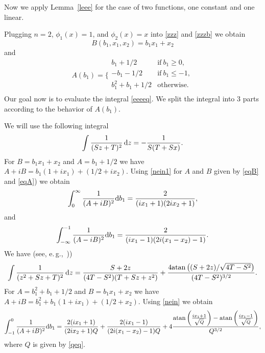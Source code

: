 \documentclass[11pt]{article}
\def\({\left(} \def\){\right)} \def\hatU{\widehat{U}}
\newenvironment{prf}[1]{\noindent{\bf{Proof #1\\}}}{$\hfill\blacksquare$\nopagebreak[4]\vskip 0.3cm}
\newcommand\BPRF[1][:]{\begin{prf}{#1}}
\begin{document}
Now we apply Lemma~\ref{leee} for the case of two functions,
one constant and one linear.
\vskip 0.3cm

\BPRF[of Theorem~\ref{looo}:] Plugging $n=2$, $\phi_1(x)=1$, and
$\phi_2(x)=x$ into \eqref{zzz} and \eqref{zzzb} we obtain
\begin{equation}\label{eqB}
B(b_1,x_1,x_2)=b_1x_1+x_2
\end{equation}
and
\begin{equation}\label{eqA}
A(b_1)=\Bigg\{\begin{array}{rl}
b_1+1/2&\mbox{if}\ b_1\geq 0,\\
-b_1-1/2&\mbox{if}\ b_1\leq -1,\\
b_1^2+b_1+1/2&\mbox{otherwise}.\\
\end{array}
\end{equation}
Our goal now is to evaluate the integral \eqref{eeeeq}. We split the integral into
$3$ parts according to the behavior of $A(b_1)$.

We will use the following integral
\begin{equation}\label{nein1}
\int \frac{1}{(Sz + T)^2}\,{\rm d}z = - \frac{1}{S(T+Sx)}.
\end{equation}
For $B=b_1x_1+x_2$ and $A=b_1+1/2$ we have $A+iB = b_1(1+ix_1)+(1/2+ix_2)$. Using
\eqref{nein1} for $A$ and $B$ given by \eqref{eqB} and \eqref{eqA}) we obtain
\begin{equation}\label{e1xx}
\int_{0}^\infty
\frac{1}{(A+iB)^2}{\rm d}b_{1}=\frac{2}{(i x_1 + 1)(2 i x_2 + 1)},
\end{equation}
and
\begin{equation}\label{e3xx}
\int_{-\infty}^{-1}
\frac{1}{(A-iB)^2}
{\rm d}b_{1}=\frac{2}{(i x_1 - 1)(2i(x_1 - x_2) - 1)}.
\end{equation}
We have (see, e.\,g.,~\cite{GR07}))
\begin{equation}\label{nein}
\int \frac{1}{(z^2 + Sz + T)^2}\,{\rm d}z =  \frac{S + 2 z}{(4 T
-S^2) (T + S z + z^2)} + \frac{
 4 {\rm atan} \((S + 2 z)/\sqrt{ 4 T -S^2}\)}{(4 T -S^2)^{3/2}}.
\end{equation}
For $A=b_1^2+b_1+1/2$ and $B=b_1x_1+x_2$ we have $A+iB = b_1^2 + b_1 ( 1 + ix_1 ) + (1/2+x_2)$.
Using \eqref{nein} we obtain
\begin{equation}\label{moui}
\int_{-1}^0
\frac{1}{(A+iB)^2}{\rm d}b_{1}
=
\frac{2 (i x_1+1)}{(2 i x_2+1)Q}+
\frac{2 (i x_1-1)}{(2 i (x_1-x_2)-1)Q}+
4\frac{{\rm atan}\(\frac{i x_1+1}{\sqrt{Q}}\)-{\rm atan}\(\frac{i x_1-1}{\sqrt{Q}}\)}
{Q^{3/2}},
\end{equation}
where $Q$ is given by \eqref{qeq}.
\end{document}
